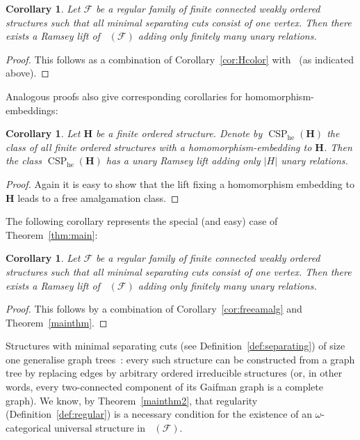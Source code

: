 \documentclass{elsarticle}
\def\Forb{\mathop{\mathrm{Forb_{he}}}\nolimits}
\def\Forbh{\mathop{\mathrm{Forb_h}}\nolimits}
\def\CSP{\mathop{\mathrm{CSP}}\nolimits}
\def\str#1{\mathbf {#1}}
\def\F{{\mathcal F}}
\theoremstyle{plain}
\newtheorem{corollary}[theorem]{Corollary}
\theoremstyle{definition}
\theoremstyle{remark}
\begin{document}
\begin{corollary}
\label{cor:duals}
Let $\F$ be a regular family of finite connected weakly ordered structures such that all minimal separating cuts consist of one vertex.
Then there exists a Ramsey lift of $\Forbh(\F)$ adding only finitely many unary relations.
\end{corollary}
\begin{proof} This follows as a combination of Corollary~\ref{cor:Hcolor} with~\cite{Hubicka2009} (as indicated above).
\end{proof}

Analogous proofs also give corresponding corollaries for homomorphism-embeddings:
\begin{corollary}
Let $\str{H}$ be a finite ordered structure. Denote by $\CSP_{\mathrm {he}}(\str{H})$ the class
of all finite ordered structures with a homomorphism-embedding to $\str{H}$. Then the class
$\CSP_{\mathrm {he}}(\str{H})$ has a unary Ramsey lift adding only $\vert H\vert $ unary relations.
\end{corollary}
\begin{proof}
Again it is easy to show that the lift fixing a homomorphism embedding to $\str{H}$ leads to a free amalgamation class.
\end{proof}
The following corollary represents the special (and easy) case of Theorem~\ref{thm:main}:
\begin{corollary}
Let $\F$ be a regular family of finite connected weakly ordered structures such that all minimal separating cuts consist of one vertex.
Then there exists a Ramsey lift of $\Forb(\F)$ adding only finitely many unary relations.
\end{corollary}
\begin{proof} This follows by a combination of Corollary~\ref{cor:freeamalg} and Theorem~\ref{mainthm}.
\end{proof}

Structures with minimal separating cuts (see Definition~\ref{def:separating}) of size one generalise graph trees~\cite{Nesetril2000}: every such structure can be constructed from a graph tree by replacing edges by arbitrary ordered irreducible structures (or, in other words,
every two-connected component of its Gaifman graph is a complete
graph).  We know, by Theorem~\ref{mainthm2}, that regularity (Definition~\ref{def:regular}) is a necessary condition
for the existence of an $\omega$-categorical universal structure in $\Forb(\F)$.
\end{document}
